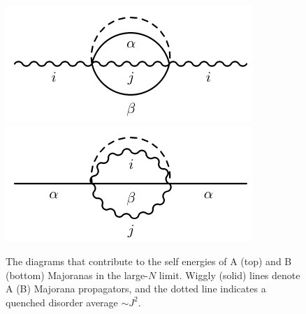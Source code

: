 \begin{figure}[h]
	\centering
	\includegraphics[width=0.5\columnwidth]{figures/chapter1/GA.pdf}
	\includegraphics[width=0.5\columnwidth]{figures/chapter1/GB.pdf}
	\caption{The diagrams that contribute to the self energies of A (top) and B (bottom) Majoranas in the large-$N$ limit. Wiggly (solid) lines denote A (B) Majorana propagators,
		and the dotted line indicates a quenched disorder average $\sim J^2$.}
	\label{fig:GreensFunction}
\end{figure}


